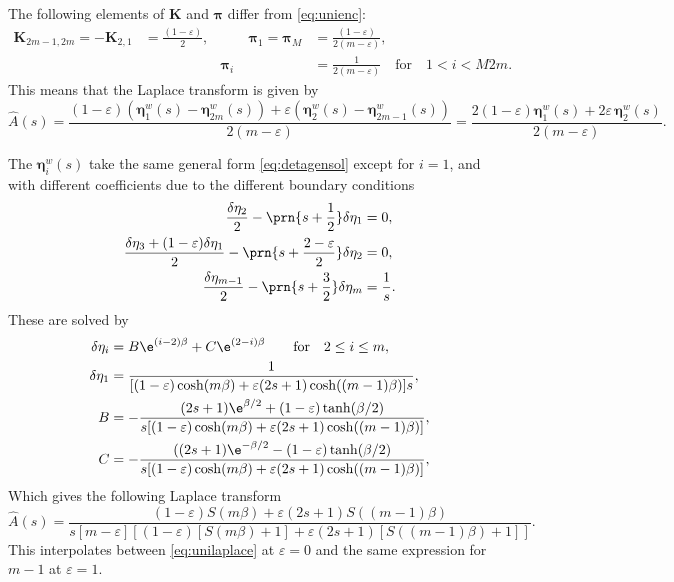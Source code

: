 \documentclass[12pt]{article}
\newcommand{\eq}{\pib}
\newcommand{\pib}{\boldsymbol{\pi}}
\newcommand{\etw}{\boldsymbol{\eta}^w}
\newcommand{\enc}{\mathbf{K}}
\begin{document}
The following elements of $\enc$ and $\eq$ differ from \eqref{eq:unienc}:
%
\begin{equation}\label{eq:shortenenc}
  \begin{aligned}
  \enc_{2m-1,2m} = -\enc_{2,1} &= \frac{(1-\varepsilon)}{2},
  &\qquad
  \eq_1 = \eq_M &= \frac{(1-\varepsilon)}{2(m-\varepsilon)},
  \\ &&
  \eq_i &=  \frac{1}{2(m-\varepsilon)}
  \quad\text{for}\quad 1<i<M2m.
  \end{aligned}
\end{equation}
%
This means that the Laplace transform is given by
%
\begin{equation}\label{eq:shortenareaeta}
  \hat{A}(s) = \frac{(1-\varepsilon)(\etw_1(s)-\etw_{2m}(s)) 
                      + \varepsilon(\etw_2(s)-\etw_{2m-1}(s))}
                    {2(m-\varepsilon)}
       = \frac{2(1-\varepsilon) \etw_1(s) + 2\varepsilon\,\etw_2(s)}
              {2(m-\varepsilon)}.
\end{equation}
%

The $\etw_i(s)$ take the same general form \eqref{eq:detagensol} except for $i=1$, and with different coefficients due to the different boundary conditions
%
\begin{equation}\label{eq:detabndshorten}
\begin{aligned}
  \frac{\delta\eta_2}{2} - \prn{s+\frac{1}{2}}\delta\eta_1 &= 0, \\
  \frac{\delta\eta_3 + (1-\varepsilon)\delta\eta_1}{2} - \prn{s+\frac{2-\varepsilon}{2}}\delta\eta_2 &= 0, \\
  \frac{\delta\eta_{m-1}}{2} - \prn{s+\frac{3}{2}}\delta\eta_{m} &= \frac{1}{s}.
\end{aligned}
\end{equation}
%
These are solved by
%
%
\begin{equation}\label{eq:shortensol}
\begin{aligned}
  \delta\eta_i &= B\e^{(i-2)\beta} + C\e^{(2-i)\beta} \qquad
        \text{for} \quad 2 \leq i \leq m, \\
  \delta\eta_1 &= \frac{1}
         {[(1-\varepsilon)\cosh(m\beta) + \varepsilon(2s+1)\cosh((m-1)\beta)]s}, \\
  B &= - \frac{(2s+1) \e^{\beta/2} + (1-\varepsilon) \tanh(\beta/2)}
         {s [(1-\varepsilon)\cosh(m\beta) + \varepsilon(2s+1)\cosh((m-1)\beta)]}, \\
  C &= - \frac{((2s+1) \e^{-\beta/2} - (1-\varepsilon) \tanh(\beta/2)}
         {s [(1-\varepsilon)\cosh(m\beta) + \varepsilon(2s+1)\cosh((m-1)\beta)]}, \\
\end{aligned}
\end{equation}
%
Which gives the following Laplace transform
%
\begin{equation}\label{eq:shortenlaplace}
  \hat{A}(s) = \frac{(1-\varepsilon) S(m\beta) + \varepsilon(2s+1) S((m-1)\beta)}
          { s [m-\varepsilon]
            [(1-\varepsilon)[S(m\beta) + 1] + \varepsilon(2s+1)[S((m-1)\beta) + 1]] }.
\end{equation}
%
This interpolates between \eqref{eq:unilaplace} at $\varepsilon=0$ and the same expression for $m-1$ at $\varepsilon=1$.
\end{document}

